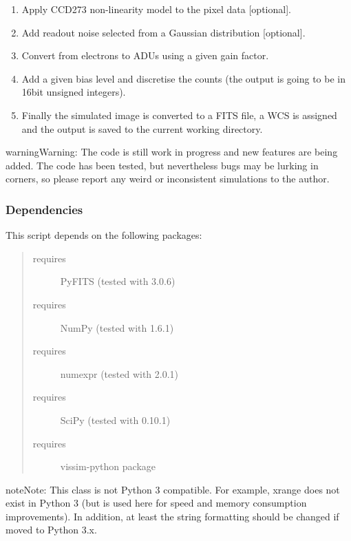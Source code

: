\documentclass[a4paper,12pt,english]{sphinxmanual}
\begin{document}
\begin{enumerate}
\item {} 
Apply CCD273 non-linearity model to the pixel data {[}optional{]}.

\item {} 
Add readout noise selected from a Gaussian distribution {[}optional{]}.

\item {} 
Convert from electrons to ADUs using a given gain factor.

\item {} 
Add a given bias level and discretise the counts (the output is going to be in 16bit unsigned integers).

\item {} 
Finally the simulated image is converted to a FITS file, a WCS is assigned
and the output is saved to the current working directory.

\end{enumerate}

\begin{notice}{warning}{Warning:}
The code is still work in progress and new features are being added.
The code has been tested, but nevertheless bugs may be lurking in corners, so
please report any weird or inconsistent simulations to the author.
\end{notice}


\subsubsection{Dependencies}
\label{simulator:dependencies}
This script depends on the following packages:
\begin{quote}\begin{description}
\item[{requires}] \leavevmode
PyFITS (tested with 3.0.6)

\item[{requires}] \leavevmode
NumPy (tested with 1.6.1)

\item[{requires}] \leavevmode
numexpr (tested with 2.0.1)

\item[{requires}] \leavevmode
SciPy (tested with 0.10.1)

\item[{requires}] \leavevmode
vissim-python package

\end{description}\end{quote}

\begin{notice}{note}{Note:}
This class is not Python 3 compatible. For example, xrange does not exist
in Python 3 (but is used here for speed and memory consumption improvements).
In addition, at least the string formatting should be changed if moved to
Python 3.x.
\end{notice}
\end{document}
